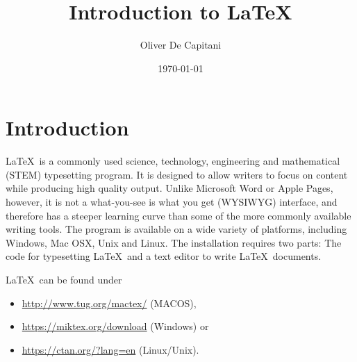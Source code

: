 \documentclass[12pt,a4paper]{article} %
\title{Introduction to \LaTeX}
\date{\today}
\author{Oliver De Capitani}
\begin{document}
\maketitle %
% 










\newpage %
\tableofcontents %











\newpage


\section{Introduction}

\LaTeX\  is a commonly used science, technology, engineering and mathematical (STEM) typesetting program. It is designed to allow writers to focus on content while producing high quality output. Unlike Microsoft Word or Apple Pages, however, it is not a what-you-see is what you get (WYSIWYG) interface, and therefore has a steeper learning curve than some of the more commonly available writing tools. The program is available on a wide variety of platforms, including Windows, Mac OSX, Unix and Linux. The installation requires two parts: The code for typesetting \LaTeX\  and a text editor to write \LaTeX\ documents.

\LaTeX\  can be found under
\begin{itemize}
\item \url{http://www.tug.org/mactex/} (MACOS), 
\item \url{https://miktex.org/download} (Windows) or
\item \url{https://ctan.org/?lang=en} (Linux/Unix). 
\end{itemize} 
\end{document}
